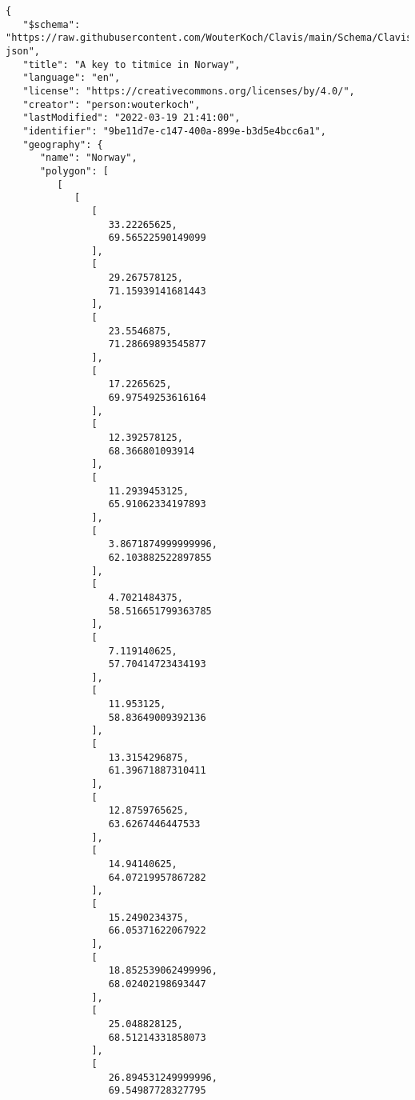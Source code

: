 \documentclass[10pt,letterpaper]{article}
\begin{document}
\vspace*{0.2in}

\begin{flushleft}
{\Large
\textbf{}}
\newline
\end{flushleft}
\linenumbers
\begin{verbatim}
{
   "$schema":
"https://raw.githubusercontent.com/WouterKoch/Clavis/main/Schema/Clavis.
json",
   "title": "A key to titmice in Norway",
   "language": "en",
   "license": "https://creativecommons.org/licenses/by/4.0/",
   "creator": "person:wouterkoch",
   "lastModified": "2022-03-19 21:41:00",
   "identifier": "9be11d7e-c147-400a-899e-b3d5e4bcc6a1",
   "geography": {
      "name": "Norway",
      "polygon": [
         [
            [
               [
                  33.22265625,
                  69.56522590149099
               ],
               [
                  29.267578125,
                  71.15939141681443
               ],
               [
                  23.5546875,
                  71.28669893545877
               ],
               [
                  17.2265625,
                  69.97549253616164
               ],
               [
                  12.392578125,
                  68.366801093914
               ],
               [
                  11.2939453125,
                  65.91062334197893
               ],
               [
                  3.8671874999999996,
                  62.103882522897855
               ],
               [
                  4.7021484375,
                  58.516651799363785
               ],
               [
                  7.119140625,
                  57.70414723434193
               ],
               [
                  11.953125,
                  58.83649009392136
               ],
               [
                  13.3154296875,
                  61.39671887310411
               ],
               [
                  12.8759765625,
                  63.6267446447533
               ],
               [
                  14.94140625,
                  64.07219957867282
               ],
               [
                  15.2490234375,
                  66.05371622067922
               ],
               [
                  18.852539062499996,
                  68.02402198693447
               ],
               [
                  25.048828125,
                  68.51214331858073
               ],
               [
                  26.894531249999996,
                  69.54987728327795

\end{verbatim}
\end{document}
